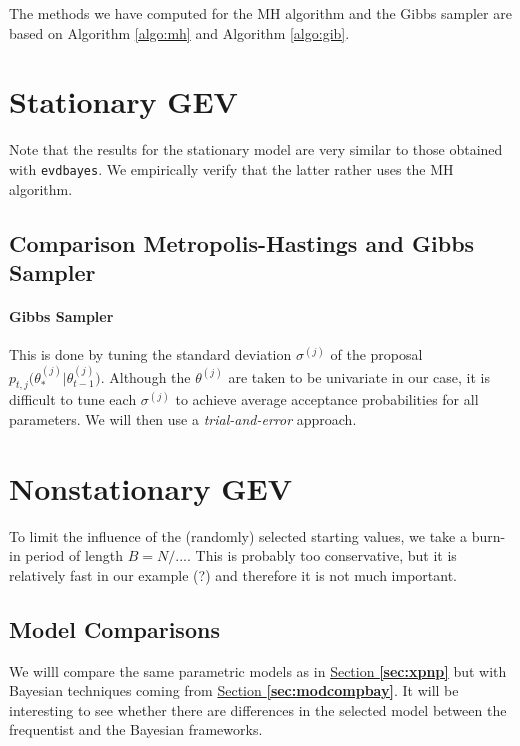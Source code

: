 The methods we have computed for the MH algorithm and the Gibbs sampler are based on Algorithm \ref{algo:mh} and Algorithm \ref{algo:gib}.

\section{Stationary GEV}

Note that the results for the stationary model are very similar to those obtained with \texttt{evdbayes}. We empirically verify that the latter rather uses the MH algorithm.

\subsection*{Comparison Metropolis-Hastings and Gibbs Sampler}



\paragraph{Gibbs Sampler}

This is done by tuning the standard deviation $\sigma^{(j)}$ of the proposal $p_{t,j}\big(\theta_*^{(j)}|\theta_{t-1}^{(j)}\big)$. Although the $\theta^{(j)}$ are taken to be univariate in our case, it is difficult to tune each $\sigma^{(j)}$ to achieve average acceptance probabilities for all parameters. We will then use a \emph{trial-and-error} approach.


\section{Nonstationary GEV}


To limit the influence of the (randomly) selected starting values, we take a burn-in period of length $B=N/....$ 
This is probably too conservative, but it is relatively fast in our example (?) and therefore it is not much important.


\subsection{Model Comparisons}




We willl compare the same parametric models as in \hyperref[sec:xpnp]{Section \textbf{\ref{sec:xpnp}}} but with Bayesian techniques coming from \hyperref[sec:modcompbay]{Section \textbf{\ref{sec:modcompbay}}}. It will be interesting to see whether there are differences in the selected model between the frequentist and the Bayesian frameworks.

